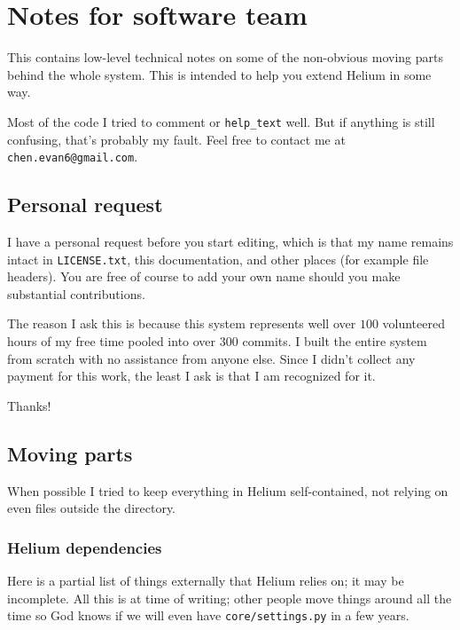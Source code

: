 \chapter{Notes for software team}
This contains low-level technical notes on some of the non-obvious
moving parts behind the whole system.
This is intended to help you extend Helium in some way.

Most of the code I tried to comment or \verb+help_text+ well.
But if anything is still confusing, that's probably my fault.
Feel free to contact me at \texttt{chen.evan6@gmail.com}.

\section{Personal request}
I have a personal request before you start editing,
which is that my name remains intact in \texttt{LICENSE.txt},
this documentation, and other places (for example file headers).
You are free of course to add your own name
should you make substantial contributions.

The reason I ask this is because this system represents
well over $100$ volunteered hours of my free time
pooled into over $300$ commits.
I built the entire system from scratch with no assistance from anyone else.
Since I didn't collect any payment for this work,
the least I ask is that I am recognized for it.

Thanks!

\section{Moving parts}
When possible I tried to keep everything in Helium 
self-contained, not relying on even files outside the directory.

\subsection{Helium dependencies}
Here is a partial list of things externally that Helium relies on;
it may be incomplete.
All this is at time of writing;
other people move things around all the time so God knows
if we will even have \texttt{core/settings.py} in a few years.

